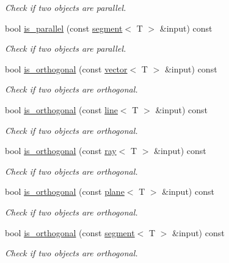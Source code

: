 \begin{DoxyCompactItemize}
\begin{DoxyCompactList}\small\item\em Check if two objects are parallel. \end{DoxyCompactList}\item 
bool \hyperlink{classddd_1_1triangle_a7f8fcee75b7b053c7f62bbf7cdc759cb}{is\+\_\+parallel} (const \hyperlink{classddd_1_1segment}{segment}$<$ T $>$ \&input) const
\begin{DoxyCompactList}\small\item\em Check if two objects are parallel. \end{DoxyCompactList}\item 
bool \hyperlink{classddd_1_1triangle_a6b750dcea35f2baf2e8a331d66a7fbe0}{is\+\_\+orthogonal} (const \hyperlink{classddd_1_1vector}{vector}$<$ T $>$ \&input) const
\begin{DoxyCompactList}\small\item\em Check if two objects are orthogonal. \end{DoxyCompactList}\item 
bool \hyperlink{classddd_1_1triangle_a69185916f0406188b4dbb7890d75ef65}{is\+\_\+orthogonal} (const \hyperlink{classddd_1_1line}{line}$<$ T $>$ \&input) const
\begin{DoxyCompactList}\small\item\em Check if two objects are orthogonal. \end{DoxyCompactList}\item 
bool \hyperlink{classddd_1_1triangle_ac0a2b1a3f58cee686599c681bb955d92}{is\+\_\+orthogonal} (const \hyperlink{classddd_1_1ray}{ray}$<$ T $>$ \&input) const
\begin{DoxyCompactList}\small\item\em Check if two objects are orthogonal. \end{DoxyCompactList}\item 
bool \hyperlink{classddd_1_1triangle_ab165278d21b58f2dde0c7cec255cdff0}{is\+\_\+orthogonal} (const \hyperlink{classddd_1_1plane}{plane}$<$ T $>$ \&input) const
\begin{DoxyCompactList}\small\item\em Check if two objects are orthogonal. \end{DoxyCompactList}\item 
bool \hyperlink{classddd_1_1triangle_a8be06a2c15e540723e277fc5ab131143}{is\+\_\+orthogonal} (const \hyperlink{classddd_1_1segment}{segment}$<$ T $>$ \&input) const
\begin{DoxyCompactList}\small\item\em Check if two objects are orthogonal. \end{DoxyCompactList}\item 

\end{DoxyCompactItemize}
